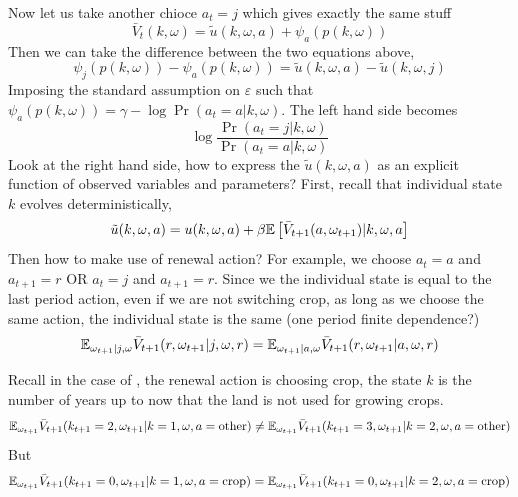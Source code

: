 \documentclass[12pt]{article}[margin=1in]
\begin{document}
Now let us take another chioce $a_t=j$ which gives exactly the same stuff
$$ \bar{V}_t(k, \omega) = \tilde{u}(k, \omega, a) + \psi_a(p(k,\omega)) $$
Then we can take the difference between the two equations above,
$$ \psi_j(p(k,\omega)) - \psi_a(p(k,\omega)) = \tilde{u}(k, \omega, a) - \tilde{u}(k, \omega, j) $$
Imposing the standard assumption on $\varepsilon$ such that $\psi_a(p(k,\omega)) = \gamma - \log \Pr(a_t = a | k, \omega)$.
The left hand side becomes $$ \log \frac{\Pr(a_t = j | k, \omega)}{\Pr(a_t = a | k, \omega)} $$
Look at the right hand side, how to express the $\tilde{u}(k, \omega, a)$ as an explicit function of observed variables and parameters? 
First, recall that individual state $k$ evolves deterministically,
$$ \tilde{u}(k, \omega, a)  = u(k, \omega, a) + \beta \mathbb{E}\left[\bar{V}_{t+1}(a, \omega_{t+1}) | k, \omega, a\right] $$
Then how to make use of renewal action? For example, we choose $a_t = a$ and $a_{t+1} = r$ OR $a_t = j$ and $a_{t+1} = r$. Since we the individual state is equal to the last period action, even if we are not switching crop, as long as we choose the same action, the individual state is the same (one period finite dependence?)
$$ \mathbb{E}_{\omega_{t+1}|j,\omega} \bar{V}_{t+1}(r, \omega_{t+1}| j, \omega, r) = \mathbb{E}_{\omega_{t+1}|a,\omega}\bar{V}_{t+1}(r, \omega_{t+1}| a,\omega, r)$$

Recall in the case of \citet{scott2014dynamic}, the renewal action is choosing crop, the state $k$ is the number of years up to now that the land is not used for growing crops. 
$$ \mathbb{E}_{\omega_{t+1}} \bar{V}_{t+1}(k_{t+1}=2, \omega_{t+1}|k=1,\omega, a=\text{other}) \neq \mathbb{E}_{\omega_{t+1}} \bar{V}_{t+1}(k_{t+1}=3, \omega_{t+1}| k=2,\omega, a=\text{other})$$
But 
$$ \mathbb{E}_{\omega_{t+1}} \bar{V}_{t+1}(k_{t+1}=0, \omega_{t+1}|k=1,\omega, a=\text{crop}) = \mathbb{E}_{\omega_{t+1}} \bar{V}_{t+1}(k_{t+1}=0, \omega_{t+1}| k=2,\omega, a=\text{crop})$$
\end{document}
